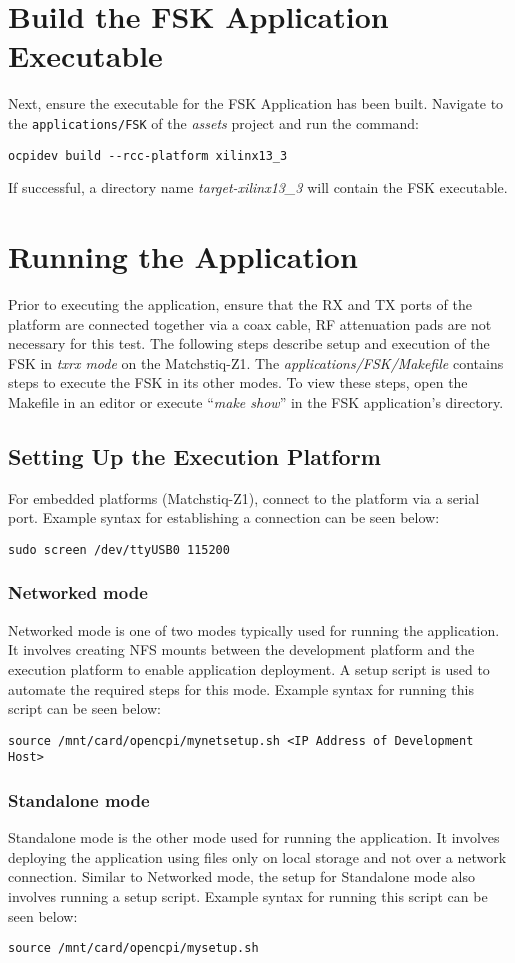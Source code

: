 \begin{flushleft}
\section{Build the FSK Application Executable}
Next, ensure the executable for the FSK Application has been built. Navigate to the \texttt{applications/FSK} of the \textit{assets} project and run the command:
\begin{verbatim}
ocpidev build --rcc-platform xilinx13_3
\end{verbatim}
If successful, a directory name \textit{target-xilinx13\_3} will contain the FSK executable.

\section{Running the Application}
Prior to executing the application, ensure that the RX and TX ports of the platform are connected together via a coax cable, RF attenuation pads are not necessary for this test. The following steps describe setup and execution of the FSK in \textit{txrx mode} on the Matchstiq-Z1. The \textit{applications/FSK/Makefile} contains steps to execute the FSK in its other modes. To view these steps, open the Makefile in an editor or execute ``\textit{make show}'' in the FSK application's directory.
\subsection{Setting Up the Execution Platform}
For embedded platforms (Matchstiq-Z1), connect to the platform via a serial port. Example syntax for establishing a connection can be seen below:
\begin{verbatim}
sudo screen /dev/ttyUSB0 115200
\end{verbatim}
\subsubsection{Networked mode}
Networked mode is one of two modes typically used for running the application. It involves creating NFS mounts between the development platform and the execution platform to enable application deployment. A setup script is used to automate the required steps for this mode. Example syntax for running this script can be seen below:
\begin{verbatim}
source /mnt/card/opencpi/mynetsetup.sh <IP Address of Development Host>
\end{verbatim}
\subsubsection{Standalone mode}
Standalone mode is the other mode used for running the application. It involves deploying the application using files only on local storage and not over a network connection. Similar to Networked mode, the setup for Standalone mode also involves running a setup script. Example syntax for running this script can be seen below:
\begin{verbatim}
source /mnt/card/opencpi/mysetup.sh
\end{verbatim}

\end{flushleft}

